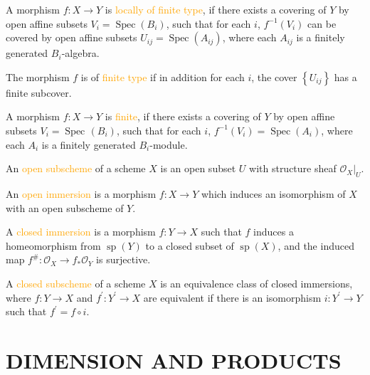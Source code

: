 \begin{definition}
	A morphism $f:X\rightarrow Y$ is \textcolor{orange}{locally of finite type}, if there exists a covering of $Y$ by open affine subsets $V_i=\operatorname{Spec}\!\left(B_i\right)$, such that for each $i$, $f^{-1}\!\left(V_i\right)$ can be covered by open affine subsets $U_{ij}=\operatorname{Spec}\!\left(A_{ij}\right)$, where each $A_{ij}$ is a finitely generated $B_i$-algebra.
	
	The morphism $f$ is of \textcolor{orange}{finite type} if in addition for each $i$, the cover $\left\{U_{ij}\right\}$ has a finite subcover.

\end{definition}

\begin{definition}
	A morphism $f:X\rightarrow Y$ is \textcolor{orange}{finite}, if there exists a covering of $Y$ by open affine subsets $V_i=\operatorname{Spec\!}\left(B_i\right)$, such that for each $i$, $f^{-1}\!\left(V_i\right)=\operatorname{Spec}\!\left(A_i\right)$, where each $A_i$ is a finitely generated $B_i$-module.
\end{definition}

\begin{definition}
	An \textcolor{orange}{open subscheme} of a scheme $X$ is an open subset $U$ with structure sheaf $\mathcal{O}_X|_U$.
	
	An \textcolor{orange}{open immersion} is a morphism $f:X\rightarrow Y$ which induces an isomorphism of $X$ with an open subscheme of $Y$.
\end{definition}

\begin{definition}
	A \textcolor{orange}{closed immersion} is a morphism $f:Y\rightarrow X$ such that $f$ induces a homeomorphism from $\operatorname{sp}(Y)$ to a closed subset of $\operatorname{sp}(X)$, and the induced map $f^\#:\mathcal{O}_X\rightarrow f_*\mathcal{O}_Y$ is surjective.
	
	A \textcolor{orange}{closed subscheme} of a scheme $X$ is an equivalence class of closed immersions, where $f:Y\rightarrow X$ and $f^\prime:Y^\prime\rightarrow X$ are equivalent if there is an isomorphism $i:Y^\prime\rightarrow Y$ such that $f^\prime=f\circ i$.
\end{definition}

\section*{DIMENSION AND PRODUCTS}

